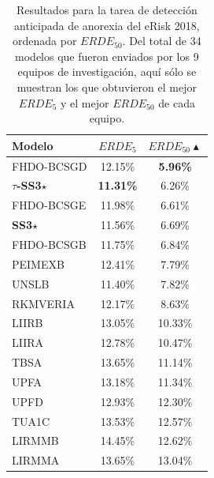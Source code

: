 \begin{table}[t]
\centering
\caption{Resultados para la tarea de detección anticipada de anorexia del eRisk 2018, ordenada por $ERDE_{50}$. Del total de 34 modelos que fueron enviados por los 9 equipos de investigación, aquí sólo se muestran los que obtuvieron el mejor $ERDE_{5}$ y el mejor $ERDE_{50}$ de cada equipo.}
\label{tab:results-a2018}
\begin{tabular}{l | c c}
\hline
Modelo & $ERDE_{5}$ & $ERDE_{50}\blacktriangle$ \\ \hline
FHDO-BCSGD & 12.15\% & \textbf{5.96\%}  \\
\textbf{$\tau$-SS3}$\star$ & \textbf{11.31\%} & 6.26\%  \\
FHDO-BCSGE & 11.98\% & 6.61\%  \\
\textbf{SS3}$\star$ & 11.56\% & 6.69\% \\
FHDO-BCSGB & 11.75\% & 6.84\%  \\
PEIMEXB & 12.41\% & 7.79\%  \\
UNSLB & 11.40\% & 7.82\%  \\
RKMVERIA & 12.17\% & 8.63\%  \\
LIIRB & 13.05\% & 10.33\%  \\
LIIRA & 12.78\% & 10.47\%  \\
TBSA & 13.65\% & 11.14\%  \\
UPFA & 13.18\% & 11.34\%  \\
UPFD & 12.93\% & 12.30\%  \\
TUA1C & 13.53\% & 12.57\%  \\
LIRMMB & 14.45\% & 12.62\%  \\
LIRMMA & 13.65\% & 13.04\%  \\
\hline
\end{tabular}
\end{table}



